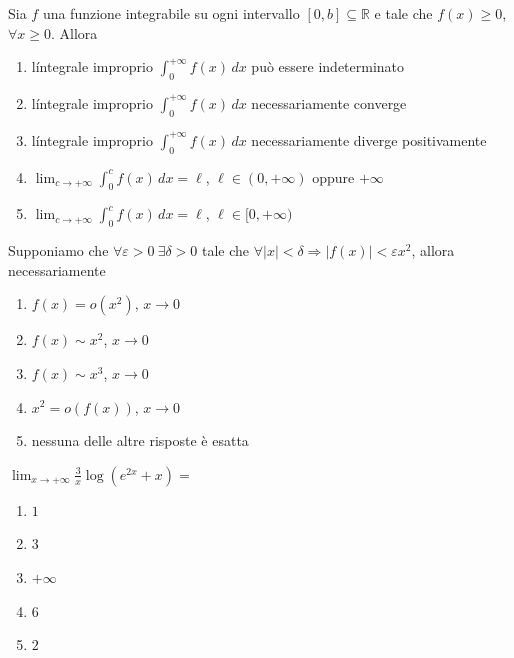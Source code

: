 \begin{quiz}
Sia $f$ una funzione integrabile su ogni intervallo $[0,b]\subseteq\mathbb R$ e tale che $f(x)\geq0$, $\forall x\geq0$. Allora
\begin{enumerate}
\item l\'integrale improprio $\int_0^{+\infty}f(x)\,dx$ pu\`o essere indeterminato
\item l\'integrale improprio $\int_0^{+\infty}f(x)\,dx$ necessariamente converge
\item l\'integrale improprio $\int_0^{+\infty}f(x)\,dx$ necessariamente diverge positivamente
\item $\lim_{c\to+\infty}\int_0^cf(x)\,dx=\ell$, $\ell\in(0,+\infty)$ oppure $+\infty$
\item $\lim_{c\to+\infty}\int_0^cf(x)\,dx=\ell$, $\ell\in[0,+\infty)$
\end{enumerate}
\end{quiz}

\begin{quiz}
Supponiamo che $\forall\varepsilon>0\ \exists\delta>0$ tale che $\forall |x|<\delta\Rightarrow |f(x)|<\varepsilon x^2$, allora necessariamente
\begin{enumerate}
\item $f(x)=o(x^2)$, $x\to0$
\item $f(x)\sim x^2$, $x\to0$
\item $f(x)\sim x^3$, $x\to0$
\item $x^2=o(f(x))$, $x\to0$
\item nessuna delle altre risposte \`e esatta
\end{enumerate}
\end{quiz}

\begin{quiz}
$\displaystyle\lim_{x\to+\infty}\frac3x\log(e^{2x}+x)=$
\begin{enumerate}
\item $1$
\item $3$
\item $+\infty$
\item $6$
\item $2$
\end{enumerate}
\end{quiz}

